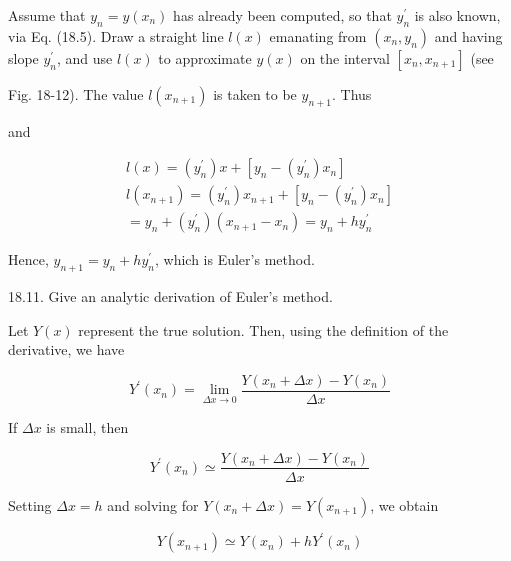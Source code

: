 \documentclass[10pt]{article}
\begin{document}
Assume that $y_{n}=y\left(x_{n}\right)$ has already been computed, so that $y_{n}^{\prime}$ is also known, via Eq. (18.5). Draw a straight line $l(x)$ emanating from $\left(x_{n}, y_{n}\right)$ and having slope $y_{n}^{\prime}$, and use $l(x)$ to approximate $y(x)$ on the interval $\left[x_{n}, x_{n+1}\right]$ (see

Fig. 18-12). The value $l\left(x_{n+1}\right)$ is taken to be $y_{n+1}$. Thus

and

$$
\begin{gathered}
l(x)=\left(y_{n}^{\prime}\right) x+\left[y_{n}-\left(y_{n}^{\prime}\right) x_{n}\right] \\
l\left(x_{n+1}\right)=\left(y_{n}^{\prime}\right) x_{n+1}+\left[y_{n}-\left(y_{n}^{\prime}\right) x_{n}\right] \\
=y_{n}+\left(y_{n}^{\prime}\right)\left(x_{n+1}-x_{n}\right)=y_{n}+h y_{n}^{\prime}
\end{gathered}
$$

Hence, $y_{n+1}=y_{n}+h y_{n}^{\prime}$, which is Euler's method.

18.11. Give an analytic derivation of Euler's method.

Let $Y(x)$ represent the true solution. Then, using the definition of the derivative, we have

$$
Y^{\prime}\left(x_{n}\right)=\lim _{\Delta x \rightarrow 0} \frac{Y\left(x_{n}+\Delta x\right)-Y\left(x_{n}\right)}{\Delta x}
$$

If $\Delta x$ is small, then

$$
Y^{\prime}\left(x_{n}\right) \simeq \frac{Y\left(x_{n}+\Delta x\right)-Y\left(x_{n}\right)}{\Delta x}
$$

Setting $\Delta x=h$ and solving for $Y\left(x_{n}+\Delta x\right)=Y\left(x_{n+1}\right)$, we obtain


\begin{equation*}
Y\left(x_{n+1}\right) \simeq Y\left(x_{n}\right)+h Y^{\prime}\left(x_{n}\right) \tag{1}
\end{equation*}
\end{document}

